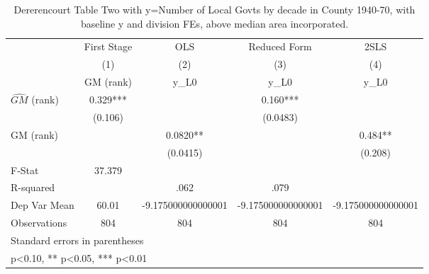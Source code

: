 \begin{table}[htbp]\centering
\def\sym#1{\ifmmode^{#1}\else\(^{#1}\)\fi}
\caption{Dererencourt Table Two with y=Number of Local Govts by decade in County 1940-70, with baseline y and division FEs, above median area incorporated.}
\begin{tabular}{l*{4}{c}}
\toprule
                    & First Stage   &         OLS   &Reduced Form   &        2SLS   \\
                    &\multicolumn{1}{c}{(1)}&\multicolumn{1}{c}{(2)}&\multicolumn{1}{c}{(3)}&\multicolumn{1}{c}{(4)}\\
                    &\multicolumn{1}{c}{GM  (rank)}&\multicolumn{1}{c}{y\_L0}&\multicolumn{1}{c}{y\_L0}&\multicolumn{1}{c}{y\_L0}\\
\midrule
$\hat{GM}$ (rank)   &       0.329***&               &       0.160***&               \\
                    &     (0.106)   &               &    (0.0483)   &               \\
\addlinespace
GM  (rank)          &               &      0.0820** &               &       0.484** \\
                    &               &    (0.0415)   &               &     (0.208)   \\
\midrule
F-Stat              &      37.379   &               &               &               \\
R-squared           &               &        .062   &        .079   &               \\
Dep Var Mean        &       60.01   &-9.175000000000001   &-9.175000000000001   &-9.175000000000001   \\
Observations        &         804   &         804   &         804   &         804   \\
\bottomrule
\multicolumn{5}{l}{\footnotesize Standard errors in parentheses}\\
\multicolumn{5}{l}{\footnotesize * p<0.10, ** p<0.05, *** p<0.01}\\
\end{tabular}
\end{table}
